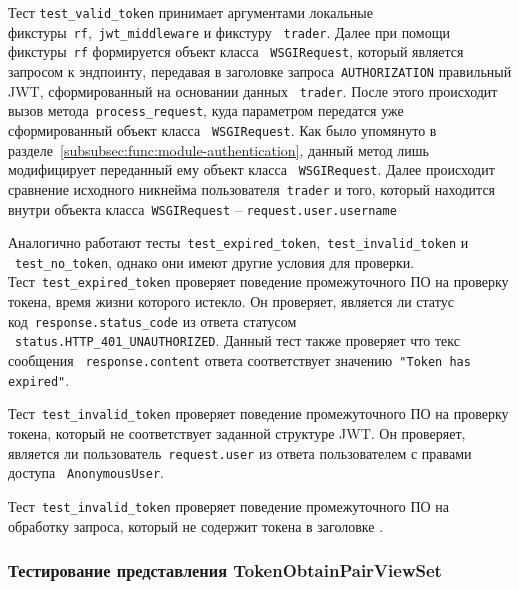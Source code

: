 Тест \lstinline{test_valid_token} принимает аргументами локальные фикстуры~\lstinline{rf},~\lstinline{jwt_middleware} и фикстуру ~\lstinline{trader}.
Далее при помощи фикстуры~\lstinline{rf} формируется объект класса ~\lstinline{WSGIRequest}, который является запросом к эндпоинту, передавая в заголовке запроса~\lstinline{AUTHORIZATION} правильный JWT, сформированный на основании данных ~\lstinline{trader}.
После этого происходит вызов метода~\lstinline{process_request}, куда параметром передатся уже сформированный объект класса ~\lstinline{WSGIRequest}.
Как было упомянуто в разделе~\ref{subsubsec:func:module-authentication}, данный метод лишь модифицирует переданный ему объект класса ~\lstinline{WSGIRequest}.
Далее происходит сравнение исходного никнейма пользователя~\lstinline{trader} и того, который находится внутри объекта класса~\lstinline{WSGIRequest} -- \lstinline{request.user.username}

Аналогично работают тесты~\lstinline{test_expired_token},~\lstinline{test_invalid_token} и ~\lstinline{test_no_token}, однако они имеют другие условия для проверки.
Тест~\lstinline{test_expired_token} проверяет поведение промежуточного ПО на проверку токена, время жизни которого истекло.
Он проверяет, является ли статус код~\lstinline{response.status_code} из ответа статусом ~\lstinline{status.HTTP_401_UNAUTHORIZED}.
Данный тест также проверяет что текс сообщения ~\lstinline{response.content} ответа соответствует значению~\lstinline{"Token has expired"}.

Тест~\lstinline{test_invalid_token} проверяет поведение промежуточного ПО на проверку токена, который не соответствует заданной структуре JWT.
Он проверяет, является ли пользователь~\lstinline{request.user} из ответа пользователем с правами доступа ~\lstinline{AnonymousUser}.

Тест~\lstinline{test_invalid_token} проверяет поведение промежуточного ПО на обработку запроса, который не содержит токена в заголовке .


\subsubsection{Тестирование представления TokenObtainPairViewSet}

